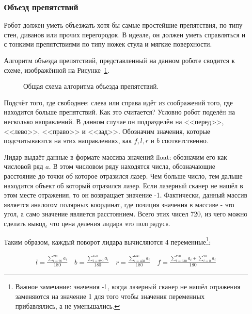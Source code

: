\subsubsection{Объезд препятствий} \label{subsub:obstacle-avoidance}

Робот должен уметь объезжать хотя-бы самые простейшие препятствия, по типу стен, диванов или прочих перегородок. В идеале, он должен уметь справляться и с тонкими препятствиями по типу ножек стула и мягкие поверхности.

Алгоритм объезда препятствий, представленный на данном роботе сводится к схеме, изображённой на Рисунке~\ref{fig:algorithm-obstacle}.

\begin{figure}[ht]
  \caption{Общая схема алгоритма объезда препятствий.}\label{fig:algorithm-obstacle}
\end{figure}

Подсчёт того, где свободнее: слева или справа идёт из соображений того, где находится больше препятствий. Как это считается? Условно робот поделён на несколько направлений. В данном случае он подразделён на <<перед>>, <<лево>>, <<право>> и <<зад>>. Обозначим значения, которые подсчитываются на этих направлениях, как $f, l, r$ и $b$ соответственно. 

Лидар выдаёт данные в формате массива значений float: обозначим его как числовой ряд $a$. В этом числовом ряду находятся числа, обозначающие расстояние до точки об которое отразился лазер. Чем больше число, тем дальше находится объект об который отразился лазер. Если лазерный сканер не нашёл в этом месте отражения, то он возвращает значение -1. Фактически, данный массив является аналогом полярных координат, где позиция значения в массиве - это угол, а само значение является расстоянием. Всего этих чисел 720, из чего можно сделать вывод, что цена деления лидара это полградуса. 

Таким образом, каждый поворот лидара вычисляются 4 переменные\footnote{Важное замечание: значения -1, когда лазерный сканер не нашёл отражения заменяются на значение 1 для того чтобы значения переменных прибавлялись, а не уменьшались.}:

\[
\begin{array}{c}
l = \frac{\displaystyle\sum_{i=90}^{270} a_i}{180} \quad
b = \frac{\displaystyle\sum_{i=270}^{450} a_i}{180}\quad
r = \frac{\displaystyle\sum_{i=450}^{630} a_i}{180} \quad
f = \frac{\displaystyle\sum_{i=630}^{720} a_i + \sum_{i=0}^{90} a_i}{180}
\end{array}
\]

